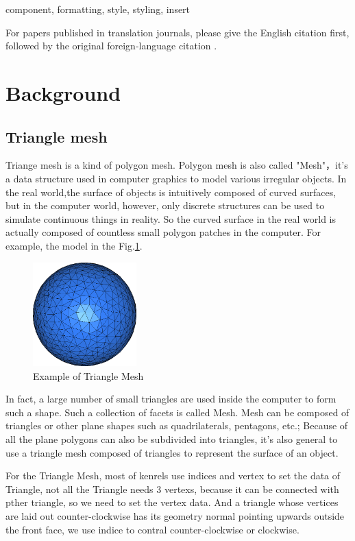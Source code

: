 \documentclass[conference]{IEEEtran}
\begin{document}
\begin{IEEEkeywords}
component, formatting, style, styling, insert
\end{IEEEkeywords}
For papers published in translation journals, please give the English 
citation first, followed by the original foreign-language citation \cite{b6}.

\section{Background}
\subsection{Triangle mesh}
Triange mesh is a kind of polygon mesh. Polygon mesh is also called "Mesh"，it's a data structure used in computer graphics to model various irregular objects. In the real world,the surface of objects is intuitively composed of curved surfaces, but in the computer world, however, only discrete structures can be used to simulate continuous things in reality. So the curved surface in the real world is actually composed of countless small polygon patches in the computer. For example, the model in the Fig.\ref{Triangle Mesh_sphere_surface}. 
\begin{figure}[ht]
    \caption{Example of Triangle Mesh}
    \label{Triangle Mesh_sphere_surface}
    \centering 
    \includegraphics[width=4cm]{Triangle Mesh_sphere_surface.png}
\end{figure}

In fact, a large number of small triangles are used inside the computer to form such a shape. Such a collection of facets is called Mesh. Mesh can be composed of triangles or other plane shapes such as quadrilaterals, pentagons, etc.; Because of all the plane polygons can also be subdivided into triangles, it's also general to use a triangle mesh composed of triangles to represent the surface of an object.

For the Triangle Mesh, most of kenrels use indices and vertex to set the data of Triangle, not all the Triangle needs 3 vertexs, because it can be connected with pther triangle, so we need to set the vertex data. And a triangle whose vertices are laid out counter-clockwise has its geometry normal pointing upwards outside the front face, we use indice to contral counter-clockwise or clockwise.
\end{document}
